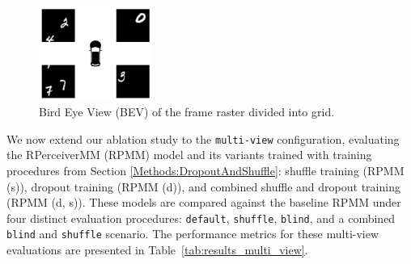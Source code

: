 \begin{figure}
    \centering
    \includegraphics[width=0.33\textwidth]{figures/figure_methods_dataset_image_view_bev.png}
    \caption{Bird Eye View (BEV) of the frame raster divided into grid.}
    \label{fig:figure_methods_dataset_image_view_bev}
\end{figure}

We now extend our ablation study to the \texttt{multi-view} configuration, evaluating the RPerceiverMM (RPMM) model and its variants trained with training procedures from Section \ref{Methods:DropoutAndShuffle}: shuffle training (RPMM (s)), dropout training (RPMM (d)), and combined shuffle and dropout training (RPMM (d, s)). These models are compared against the baseline RPMM under four distinct evaluation procedures: \texttt{default}, \texttt{shuffle}, \texttt{blind}, and a combined \texttt{blind} and \texttt{shuffle} scenario. The performance metrics for these multi-view evaluations are presented in Table~\ref{tab:results_multi_view}.


